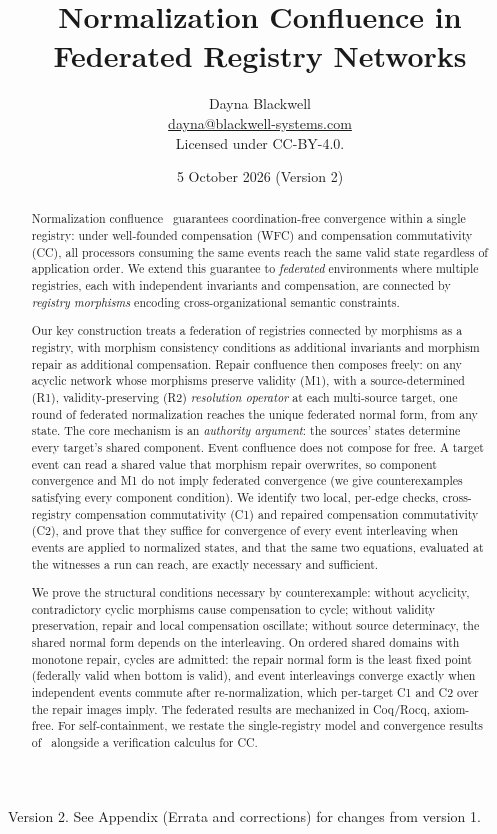 \documentclass[11pt,a4paper]{article}
\title{Normalization Confluence in Federated Registry Networks}
\author{
Dayna Blackwell\\
\small\href{mailto:dayna@blackwell-systems.com}{dayna@blackwell-systems.com}\\
\small Licensed under CC-BY-4.0.}
\date{5 October 2026 (Version 2)}
\theoremstyle{plain}
\theoremstyle{definition}
\theoremstyle{remark}
\renewcommand{\_}{\textunderscore\allowbreak}
\begin{document}
\maketitle

\begin{center}
\small Version 2. See Appendix (Errata and corrections) for changes from version 1.
\end{center}

\begin{abstract}
\setlength{\parskip}{0.6\baselineskip plus 2pt minus 1pt}
Normalization confluence~\cite{blackwell2026nc} guarantees coordination-free
convergence within a single registry: under well-founded compensation (WFC)
and compensation commutativity (CC), all processors consuming the same events
reach the same valid state regardless of application order.  We extend this
guarantee to \emph{federated} environments where multiple registries, each
with independent invariants and compensation, are connected by
\emph{registry morphisms} encoding cross-organizational semantic constraints.

Our key construction treats a federation of registries connected by morphisms
as a registry, with morphism consistency conditions as additional invariants
and morphism repair as additional compensation.  Repair confluence then
composes freely: on any acyclic network whose morphisms preserve validity (M1),
with a source-determined (R1), validity-preserving (R2) \emph{resolution
operator} at each multi-source target, one round of federated normalization
reaches the unique federated normal form, from any state.  The core mechanism
is an \emph{authority argument}: the sources' states determine every target's
shared component.  Event confluence does not compose for free.  A target event
can read a shared value that morphism repair overwrites, so component
convergence and M1 do not imply federated convergence (we give counterexamples
satisfying every component condition).  We identify two local, per-edge checks,
cross-registry compensation commutativity (C1) and repaired compensation
commutativity (C2), and prove that they suffice for convergence of every event
interleaving when events are applied to normalized states, and that the same two
equations, evaluated at the witnesses a run can reach, are exactly necessary and
sufficient.

We prove the structural conditions necessary by counterexample: without
acyclicity, contradictory cyclic morphisms cause compensation to cycle;
without validity preservation, repair and local compensation oscillate; without
source determinacy, the shared normal form depends on the interleaving.  On
ordered shared domains with monotone repair, cycles are admitted: the repair
normal form is the least fixed point (federally valid when bottom is valid), and
event interleavings converge exactly when independent events commute after
re-normalization, which per-target C1 and C2 over the repair images imply.  The
federated results are mechanized in Coq/Rocq, axiom-free.  For
self-containment, we restate the single-registry model and convergence results
of~\cite{blackwell2026nc} alongside a verification calculus for CC.
\end{abstract}
\end{document}

